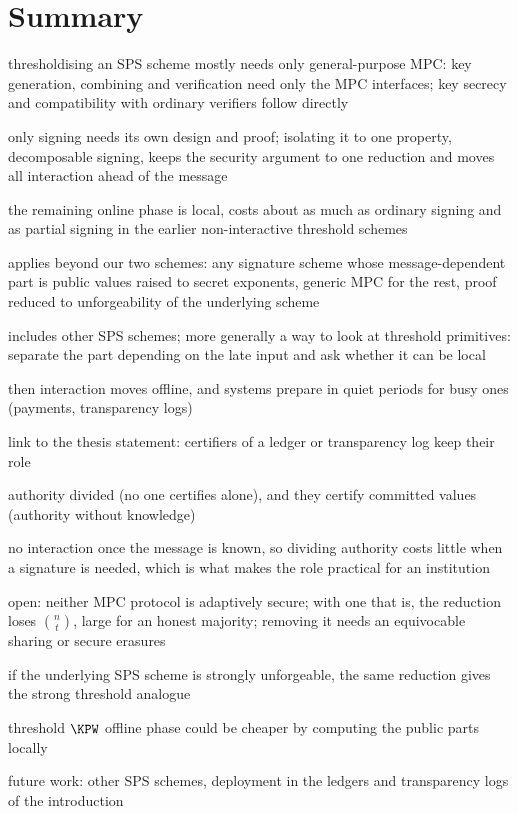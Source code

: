 \section{Summary}\label{sec:tsps-summary}

\begin{outline}
  \item thresholdising an SPS scheme mostly needs only general-purpose MPC: key
generation, combining and verification need only the MPC
interfaces; key secrecy and compatibility with ordinary verifiers follow directly
  \item only signing needs its own design and proof; isolating it to one
property, decomposable signing, keeps the security argument to one reduction and
moves all interaction ahead of the message
  \item the remaining online phase is local, costs about as much as ordinary
signing and as partial signing in the earlier non-interactive threshold schemes
\end{outline}

\begin{outline}
  \item applies beyond our two schemes: any signature scheme whose
message-dependent part is public values raised to secret exponents, generic MPC
for the rest, proof reduced to unforgeability of the underlying scheme
  \item includes other SPS schemes; more generally a way to look at threshold
primitives: separate the part depending on the late input and ask whether it can
be local
  \item then interaction moves offline, and systems prepare in quiet periods for
busy ones (payments, transparency logs)
\end{outline}

\begin{outline}
  \item link to the thesis statement: certifiers of a ledger or transparency log
keep their role
  \item authority divided (no one certifies alone), and they certify committed
values (authority without knowledge)
  \item no interaction once the message is known, so dividing authority costs
little when a signature is needed, which is what makes the role practical for an
institution
\end{outline}

\begin{outline}
  \item open: neither MPC protocol is adaptively secure; with one that is, the
reduction loses $\binom{n}{t}$, large for an honest majority; removing it needs
an equivocable sharing or secure erasures
  \item if the underlying SPS scheme is strongly unforgeable, the same reduction
gives the strong threshold analogue
  \item threshold $\KPW$ offline phase could be cheaper by computing the public
parts locally
  \item future work: other SPS schemes, deployment in the ledgers and
transparency logs of the introduction
\end{outline}
